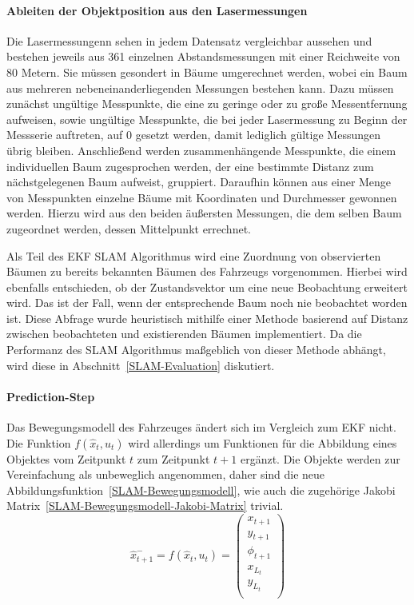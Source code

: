 \documentclass[11pt]{article}
\begin{document}
\paragraph{Ableiten der Objektposition aus den Lasermessungen}
Die Lasermessungenn sehen in jedem Datensatz vergleichbar aussehen und bestehen jeweils aus 361 einzelnen Abstandsmessungen mit einer Reichweite von 80 Metern. Sie müssen gesondert in Bäume umgerechnet werden, wobei ein Baum aus mehreren nebeneinanderliegenden Messungen bestehen kann. Dazu müssen zunächst ungültige Messpunkte, die eine zu geringe oder zu große Messentfernung aufweisen, sowie ungültige Messpunkte, die bei jeder Lasermessung zu Beginn der Messserie auftreten, auf 0 gesetzt werden, damit lediglich gültige Messungen übrig bleiben. Anschließend werden zusammenhängende Messpunkte, die einem individuellen Baum zugesprochen werden, der eine bestimmte Distanz zum nächstgelegenen Baum aufweist, gruppiert. Daraufhin können aus einer Menge von Messpunkten einzelne Bäume mit Koordinaten und Durchmesser gewonnen werden. Hierzu wird aus den beiden äußersten Messungen, die dem selben Baum zugeordnet werden, dessen Mittelpunkt errechnet.

Als Teil des EKF SLAM Algorithmus wird eine Zuordnung von observierten Bäumen zu bereits bekannten Bäumen des Fahrzeugs vorgenommen. Hierbei wird ebenfalls entschieden, ob der Zustandsvektor um eine neue Beobachtung erweitert wird. Das ist der Fall, wenn der entsprechende Baum noch nie beobachtet worden ist. Diese Abfrage wurde heuristisch mithilfe einer Methode basierend auf Distanz zwischen beobachteten und existierenden Bäumen implementiert. Da die Performanz des SLAM Algorithmus maßgeblich von dieser Methode abhängt, wird diese in Abschnitt~\ref{SLAM-Evaluation} diskutiert. 

\paragraph{Prediction-Step}
Das Bewegungsmodell des Fahrzeuges ändert sich im Vergleich zum EKF nicht. Die Funktion $f(\hat{x}_t, u_t)$ wird allerdings um Funktionen für die Abbildung eines Objektes vom Zeitpunkt $t$ zum Zeitpunkt $t+1$ ergänzt. Die Objekte werden zur Vereinfachung als unbeweglich angenommen, daher sind die neue Abbildungsfunktion~\ref{SLAM-Bewegungsmodell}, wie auch die zugehörige Jakobi Matrix~\eqref{SLAM-Bewegungsmodell-Jakobi-Matrix} trivial.
\begin{equation}\label{SLAM-Bewegungsmodell}
	\hat{x}_{t+1}^- = f(\hat{x}_{t},u_t) = \begin{pmatrix}
		x_{t+1} \\
		y_{t+1} \\
		\phi_{t+1} \\
		x_{L_t} \\
		y_{L_t} \\
	\end{pmatrix}
\end{equation}
\end{document}
